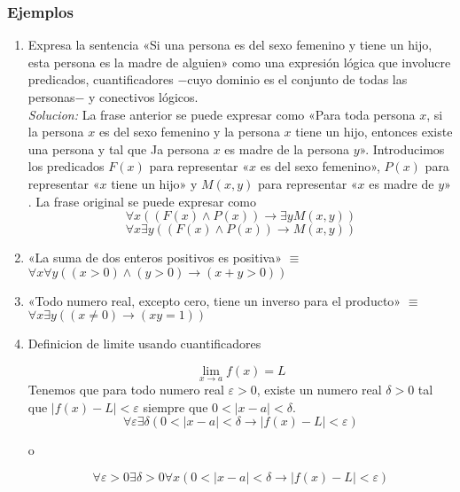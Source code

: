 \documentclass[]{article}
\begin{document}
\subsubsection*{Ejemplos}

\begin{enumerate}
	\item Expresa la sentencia «Si una persona es del sexo femenino y tiene un hijo, esta persona es la madre de alguien» como una expresión lógica que involucre predicados, cuantificadores $-$cuyo dominio es el conjunto de todas las personas$-$ y conectivos lógicos.\\
	\textit{Solucion:} La frase anterior se puede expresar como «Para toda persona $x$, si la persona $x$ es del sexo femenino y la persona $x$ tiene un hijo, entonces existe una persona y tal que Ja persona $x$ es madre de la persona $y$». Introducimos los predicados $F(x)$ para representar «$x$ es del sexo femenino», $P(x)$ para representar «$x$ tiene un hijo» y $M(x, y)$ para representar «$x$ es madre de $y$» . La frase original se puede expresar como 
	\begin{equation*}
		\forall{x}((F(x) \wedge P(x)) \rightarrow \exists{y}M(x, y))
	\end{equation*}
	\begin{equation*}
		\forall{x}\exists{y}((F(x) \wedge P(x)) \rightarrow M(x, y))
	\end{equation*}
	
	\item «La suma de dos enteros positivos es positiva» $\equiv$ $\forall{x}\forall{y} ((x > 0) \wedge (y > 0) \rightarrow (x + y > 0))$
	
	\item «Todo numero real, excepto cero, tiene un inverso para el producto» $\equiv$ $\forall{x}\exists{y} ((x \neq 0) \rightarrow (xy = 1))$
	
	\item Definicion de limite usando cuantificadores
	
	\begin{equation*}
		\lim_{x \rightarrow a} f(x) = L
	\end{equation*}
	Tenemos que para todo numero real $\varepsilon > 0$, existe un numero real $\delta > 0$ tal que $|f(x) - L| < \varepsilon$ siempre que $0 < |x - a| < \delta$.
	\begin{equation*}
		\forall{\varepsilon}\exists{\delta} (0 < |x - a| < \delta \rightarrow |f(x) - L| < \varepsilon)
	\end{equation*}
	\begin{center}
		o
	\end{center}
	\begin{equation*}
		\forall{\varepsilon} > 0 \exists{\delta} > 0 \forall{x} (0 < |x - a| < \delta \rightarrow |f(x) - L| < \varepsilon)
	\end{equation*}
\end{enumerate}
\end{document}
